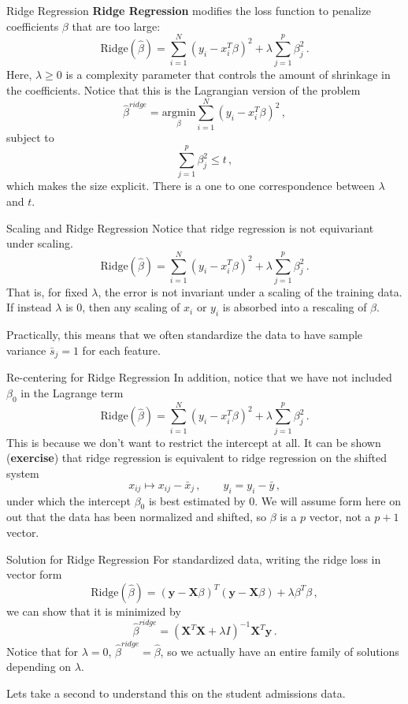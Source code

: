 \documentclass[10pt, table, dvipsnames,xcdraw,handout]{beamer}
\newcommand{\bfX}{\ensuremath{\mathbf{X}}}
\newcommand{\bfy}{\ensuremath{\mathbf{y}}}
\begin{document}
\begin{frame}[fragile]{Ridge Regression} 
\textbf{Ridge Regression} modifies the loss function to penalize coefficients $\beta$ that are too large:
$$
\text{Ridge}(\hat \beta) = \sum_{i=1}^N(y_i - x_i^T\beta)^2 +\lambda \sum_{j=1}^p\beta_j^2\,.
$$\pause
Here, $\lambda\geq 0$ is a complexity parameter that controls the amount of shrinkage in the coefficients. \pause Notice that this is the Lagrangian version of the problem
$$
\hat \beta^{ridge} =  \underset{\beta}{\text{argmin}} \sum_{i=1}^N(y_i - x_i^T\beta)^2\,,
$$
subject to 
$$
\sum_{j=1}^p\beta_j^2 \leq t\,,
$$
which makes the size explicit. There is a one to one correspondence between $\lambda$ and $t$.

\end{frame}



\begin{frame}[fragile]{Scaling and Ridge Regression} 
Notice that ridge regression is not equivariant under scaling.
$$
\text{Ridge}(\hat \beta) = \sum_{i=1}^N(y_i - x_i^T\beta)^2 +\lambda \sum_{j=1}^p\beta_j^2\,.
$$
That is, for fixed $\lambda$, the error is not invariant under a scaling of the training data. If instead $\lambda$ is 0, then any scaling of $x_i$ or $y_i$ is absorbed into a rescaling of $\beta$.\pause

Practically, this means that we often standardize the data to have sample variance $\bar s_j = 1$ for each feature. 
\end{frame}





\begin{frame}[fragile]{Re-centering for Ridge Regression} 
In addition, notice that we have not included $\beta_0$ in the Lagrange term
$$
\text{Ridge}(\hat \beta) = \sum_{i=1}^N(y_i - x_i^T\beta)^2 +\lambda \sum_{j=1}^p\beta_j^2\,.
$$\pause
This is because we don't want to restrict the intercept at all. \pause It can be shown (\textbf{exercise}) that ridge regression is equivalent to ridge regression on the shifted system
$$
x_{ij}\mapsto x_{ij} - \bar{x}_j\,,\hspace{2em} y_i = y_i - \bar{y}\,,
$$
under which the intercept $\beta_0$ is best estimated by $0$. \pause We will assume form here on out that the data has been normalized and shifted, so $\beta$ is a $p$ vector, not a $p +1$ vector. 
\end{frame}




\begin{frame}[fragile]{Solution for Ridge Regression} 
For standardized data, writing the ridge loss in vector form
$$
\text{Ridge}(\hat \beta) = (\bfy - \bfX\beta)^T(\bfy - \bfX\beta)  + \lambda\beta^T\beta\,,
$$\pause
we can show that it is minimized by
$$
\hat \beta^{ridge} = (\bfX^T\bfX + \lambda I)^{-1}\bfX^T\bfy\,.
$$\pause
Notice that for $\lambda = 0$, $\hat \beta^{ridge} = \hat\beta$, so we actually have an entire family of solutions depending on $\lambda$.\pause

Lets take a second to understand this on the student admissions data. 
\end{frame}
\end{document}
